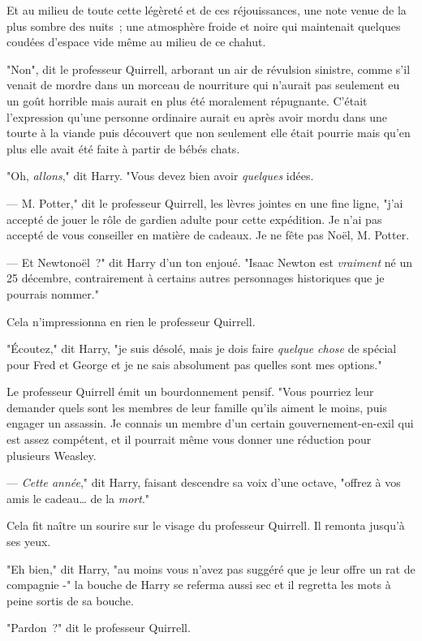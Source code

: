 Et au milieu de toute cette légèreté et de ces réjouissances, une note venue de la plus sombre des nuits~; une atmosphère froide et noire qui maintenait quelques coudées d'espace vide même au milieu de ce chahut.

"Non", dit le professeur Quirrell, arborant un air de révulsion sinistre, comme s'il venait de mordre dans un morceau de nourriture qui n'aurait pas seulement eu un goût horrible mais aurait en plus été moralement répugnante. C'était l'expression qu'une personne ordinaire aurait eu après avoir mordu dans une tourte à la viande puis découvert que non seulement elle était pourrie mais qu'en plus elle avait été faite à partir de bébés chats.

"Oh, \emph{allons}," dit Harry. "Vous devez bien avoir \emph{quelques} idées.

--- M. Potter," dit le professeur Quirrell, les lèvres jointes en une fine ligne, "j'ai accepté de jouer le rôle de gardien adulte pour cette expédition. Je n'ai pas accepté de vous conseiller en matière de cadeaux. Je ne fête pas Noël, M. Potter.

--- Et Newtonoël~?" dit Harry d'un ton enjoué. "Isaac Newton est \emph{vraiment} né un 25 décembre, contrairement à certains autres personnages historiques que je pourrais nommer."

Cela n'impressionna en rien le professeur Quirrell.

"Écoutez," dit Harry, "je suis désolé, mais je dois faire \emph{quelque chose} de spécial pour Fred et George et je ne sais absolument pas quelles sont mes options."

Le professeur Quirrell émit un bourdonnement pensif. "Vous pourriez leur demander quels sont les membres de leur famille qu'ils aiment le moins, puis engager un assassin. Je connais un membre d'un certain gouvernement-en-exil qui est assez compétent, et il pourrait même vous donner une réduction pour plusieurs Weasley.

--- \emph{Cette année}," dit Harry, faisant descendre sa voix d'une octave, "offrez à vos amis le cadeau… de la \emph{mort}."

Cela fit naître un sourire sur le visage du professeur Quirrell. Il remonta jusqu'à ses yeux.

"Eh bien," dit Harry, "au moins vous n'avez pas suggéré que je leur offre un rat de compagnie -" la bouche de Harry se referma aussi sec et il regretta les mots à peine sortis de sa bouche.

"Pardon~?" dit le professeur Quirrell.

